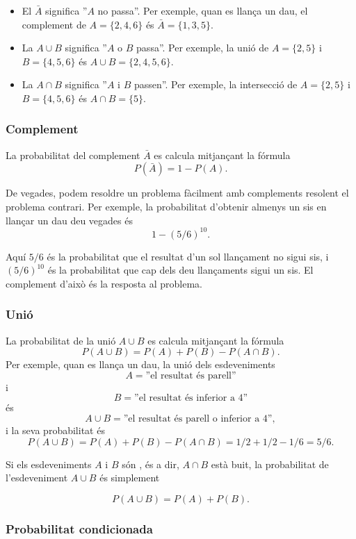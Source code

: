 \begin{itemize}
\item El  $\bar A$ significa
''$A$ no passa''.
Per exemple, quan es llança un dau,
el complement de $A=\{2,4,6\}$ és
$\bar A = \{1,3,5\}$.
\item La  $A \cup B$ significa
''$A$ o $B$ passa''.
Per exemple, la unió de
$A=\{2,5\}$
i $B=\{4,5,6\}$ és
$A \cup B = \{2,4,5,6\}$.
\item La  $A \cap B$ significa
''$A$ i $B$ passen''.
Per exemple, la intersecció de
$A=\{2,5\}$ i $B=\{4,5,6\}$ és
$A \cap B = \{5\}$.
\end{itemize}



\subsubsection{Complement}

La probabilitat del complement $\bar A$ es calcula mitjançant la
fórmula
\[P(\bar A)=1-P(A).\]


De vegades, podem resoldre un problema fàcilment amb
complements resolent el problema contrari. Per exemple, la
probabilitat d'obtenir almenys un sis en llançar un dau deu vegades és
\[1-(5/6)^{10}.\]


Aquí $5/6$ és la probabilitat que el resultat d'un sol llançament no
sigui sis, i $(5/6)^{10}$ és la probabilitat que cap dels deu
llançaments sigui un sis. El complement d'això és la resposta al
problema.

\subsubsection{Unió}

La probabilitat de la unió $A \cup B$ es calcula mitjançant la fórmula
\[P(A \cup B)=P(A)+P(B)-P(A \cap B).\]
Per exemple, quan es llança un dau, la unió dels esdeveniments
\[A=\textrm{''el resultat és parell''}\]
i
\[B=\textrm{''el resultat és inferior a 4''}\]
és
\[A \cup B=\textrm{''el resultat és parell o inferior a 4''},\]
i la seva probabilitat és
\[P(A \cup B) = P(A)+P(B)-P(A \cap B)=1/2+1/2-1/6=5/6.\]

Si els esdeveniments $A$ i $B$ són , és a dir, $A \cap
B$ està buit, la probabilitat de l'esdeveniment $A \cup B$ és
simplement


\[P(A \cup B)=P(A)+P(B).\]


\subsubsection{Probabilitat condicionada}


